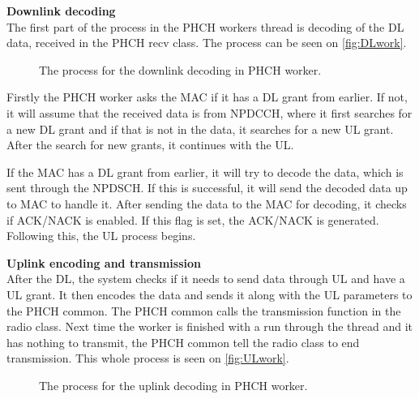 \textbf{Downlink decoding} \\

The first part of the process in the PHCH workers thread is decoding of the DL data, received in the PHCH recv class. The process can be seen on \autoref{fig:DLwork}.

\begin{figure}[H]

\centering


\resizebox{0.8\textwidth}{!}{

}

\caption{The process for the downlink decoding in PHCH worker.}

\label{fig:DLwork}

\end{figure}

Firstly the PHCH worker asks the MAC if it has a DL grant from earlier. If not, it will assume that the received data is from NPDCCH, where it first searches for a new DL grant and if that is not in the data, it searches for a new UL grant. After the search for new grants, it continues with the UL.

If the MAC has a DL grant from earlier, it will try to decode the data, which is sent through the NPDSCH. If this is successful, it will send the decoded data up to MAC to handle it. After sending the data to the MAC for decoding, it checks if ACK/NACK is enabled. If this flag is set, the ACK/NACK is generated. Following this, the UL process begins.

\textbf{Uplink encoding and transmission} \\

After the DL, the system checks if it needs to send data through UL and have a UL grant. It then encodes the data and sends it along with the UL parameters to the PHCH common. The PHCH common calls the transmission function in the radio class. Next time the worker is finished with a run through the thread and it has nothing to transmit, the PHCH common tell the radio class to end transmission. This whole process is seen on \autoref{fig:ULwork}.

\begin{figure}[H]

\centering


\resizebox{0.8\textwidth}{!}{

}

\caption{The process for the uplink decoding in PHCH worker.}

\label{fig:ULwork}

\end{figure}

